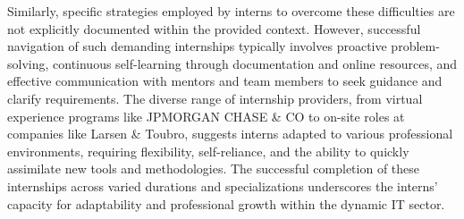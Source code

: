 \documentclass[11pt,a4paper]{article}
\newenvironment{card}{
    \begin{tcolorbox}[
        enhanced,
        colback=cardback,
        colframe=border,
        sharp corners,
        boxrule=0.5pt,
        drop shadow,
        shadow xshift=1mm,
        shadow yshift=-1mm,
        shadow color=border!50,
        boxsep=3mm,
        left=5mm, right=5mm, top=5mm, bottom=5mm,
        width=\textwidth,
        nobeforeafter
    ]
}{\end{tcolorbox}}
\begin{document}
\begin{card}
    Similarly, specific strategies employed by interns to overcome these difficulties are not explicitly documented within the provided context. However, successful navigation of such demanding internships typically involves proactive problem-solving, continuous self-learning through documentation and online resources, and effective communication with mentors and team members to seek guidance and clarify requirements. The diverse range of internship providers, from virtual experience programs like JPMORGAN CHASE \& CO to on-site roles at companies like Larsen \& Toubro, suggests interns adapted to various professional environments, requiring flexibility, self-reliance, and the ability to quickly assimilate new tools and methodologies. The successful completion of these internships across varied durations and specializations underscores the interns' capacity for adaptability and professional growth within the dynamic IT sector.
\end{card}

\vspace{0.5cm}
\end{document}
